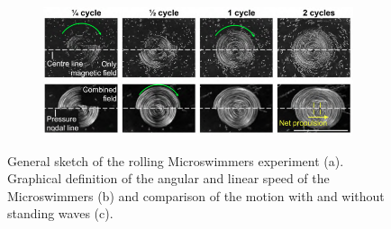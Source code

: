 \begin{figure}[b]
\begin{subfigure}{.38\columnwidth}
    \caption{}
    \label{fig:ms_rot}
    \end{subfigure}
    \begin{subfigure}{.8\columnwidth}
    \centering
    \includegraphics[width=\textwidth]{images/intro/microswimmers_cycles.png}
    \caption{}
    \label{fig:ms_cycles}
    \end{subfigure}
    \caption{General sketch of the rolling Microswimmers experiment (a). Graphical definition of the angular and linear speed of the Microswimmers (b) and comparison of the motion with and without standing waves (c).}
    \label{fig:LBMWaves}
\end{figure}

